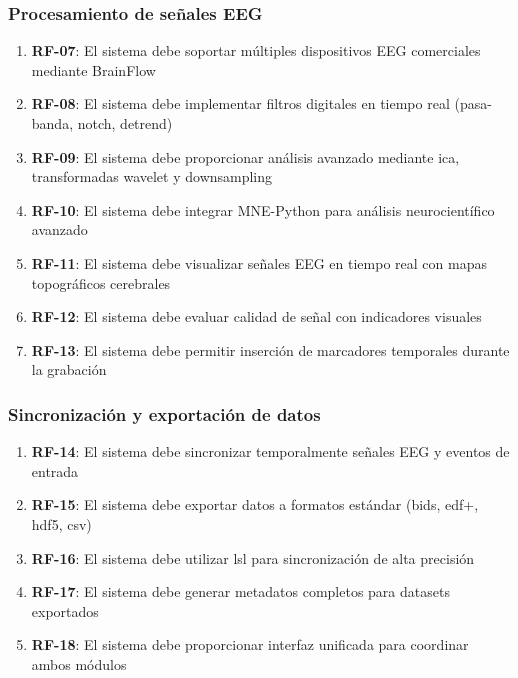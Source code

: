 \subsubsection{Procesamiento de señales EEG}
\label{subsubsec:req_procesamiento_eeg}

\begin{enumerate}
    \item \textbf{RF-07}: El sistema debe soportar múltiples dispositivos EEG comerciales mediante BrainFlow
    \item \textbf{RF-08}: El sistema debe implementar filtros digitales en tiempo real (pasa-banda, notch, detrend)
    \item \textbf{RF-09}: El sistema debe proporcionar análisis avanzado mediante \acrshort{ica}, transformadas wavelet y downsampling
    \item \textbf{RF-10}: El sistema debe integrar MNE-Python para análisis neurocientífico avanzado
    \item \textbf{RF-11}: El sistema debe visualizar señales EEG en tiempo real con mapas topográficos cerebrales
    \item \textbf{RF-12}: El sistema debe evaluar calidad de señal con indicadores visuales
    \item \textbf{RF-13}: El sistema debe permitir inserción de marcadores temporales durante la grabación
\end{enumerate}

\subsubsection{Sincronización y exportación de datos}
\label{subsubsec:req_sincronizacion}

\begin{enumerate}
    \item \textbf{RF-14}: El sistema debe sincronizar temporalmente señales EEG y eventos de entrada
    \item \textbf{RF-15}: El sistema debe exportar datos a formatos estándar (\acrshort{bids}, \acrshort{edf}+, \acrshort{hdf5}, \acrshort{csv})
    \item \textbf{RF-16}: El sistema debe utilizar \acrshort{lsl} para sincronización de alta precisión
    \item \textbf{RF-17}: El sistema debe generar metadatos completos para datasets exportados
    \item \textbf{RF-18}: El sistema debe proporcionar interfaz unificada para coordinar ambos módulos
\end{enumerate}


